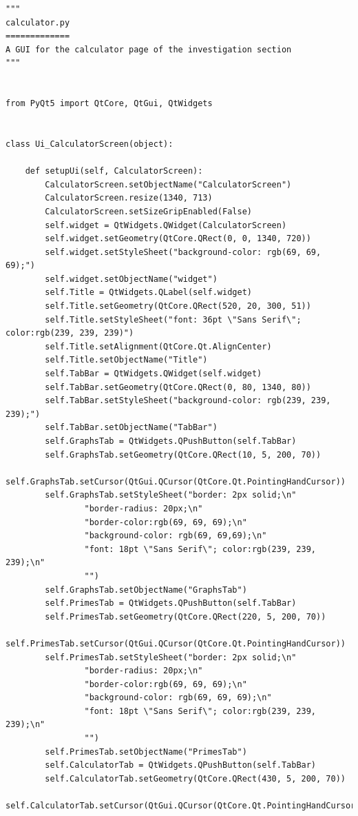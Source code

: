 \documentclass{article}
\begin{document}
\begin{lstlisting}
"""
calculator.py
=============
A GUI for the calculator page of the investigation section
"""


from PyQt5 import QtCore, QtGui, QtWidgets


class Ui_CalculatorScreen(object):

    def setupUi(self, CalculatorScreen):
        CalculatorScreen.setObjectName("CalculatorScreen")
        CalculatorScreen.resize(1340, 713)
        CalculatorScreen.setSizeGripEnabled(False)
        self.widget = QtWidgets.QWidget(CalculatorScreen)
        self.widget.setGeometry(QtCore.QRect(0, 0, 1340, 720))
        self.widget.setStyleSheet("background-color: rgb(69, 69, 69);")
        self.widget.setObjectName("widget")
        self.Title = QtWidgets.QLabel(self.widget)
        self.Title.setGeometry(QtCore.QRect(520, 20, 300, 51))
        self.Title.setStyleSheet("font: 36pt \"Sans Serif\"; color:rgb(239, 239, 239)")
        self.Title.setAlignment(QtCore.Qt.AlignCenter)
        self.Title.setObjectName("Title")
        self.TabBar = QtWidgets.QWidget(self.widget)
        self.TabBar.setGeometry(QtCore.QRect(0, 80, 1340, 80))
        self.TabBar.setStyleSheet("background-color: rgb(239, 239, 239);")
        self.TabBar.setObjectName("TabBar")
        self.GraphsTab = QtWidgets.QPushButton(self.TabBar)
        self.GraphsTab.setGeometry(QtCore.QRect(10, 5, 200, 70))
        self.GraphsTab.setCursor(QtGui.QCursor(QtCore.Qt.PointingHandCursor))
        self.GraphsTab.setStyleSheet("border: 2px solid;\n"
                "border-radius: 20px;\n"
                "border-color:rgb(69, 69, 69);\n"
                "background-color: rgb(69, 69,69);\n"
                "font: 18pt \"Sans Serif\"; color:rgb(239, 239, 239);\n"
                "")
        self.GraphsTab.setObjectName("GraphsTab")
        self.PrimesTab = QtWidgets.QPushButton(self.TabBar)
        self.PrimesTab.setGeometry(QtCore.QRect(220, 5, 200, 70))
        self.PrimesTab.setCursor(QtGui.QCursor(QtCore.Qt.PointingHandCursor))
        self.PrimesTab.setStyleSheet("border: 2px solid;\n"
                "border-radius: 20px;\n"
                "border-color:rgb(69, 69, 69);\n"
                "background-color: rgb(69, 69, 69);\n"
                "font: 18pt \"Sans Serif\"; color:rgb(239, 239, 239);\n"
                "")
        self.PrimesTab.setObjectName("PrimesTab")
        self.CalculatorTab = QtWidgets.QPushButton(self.TabBar)
        self.CalculatorTab.setGeometry(QtCore.QRect(430, 5, 200, 70))
        self.CalculatorTab.setCursor(QtGui.QCursor(QtCore.Qt.PointingHandCursor))

\end{lstlisting}
\end{document}
